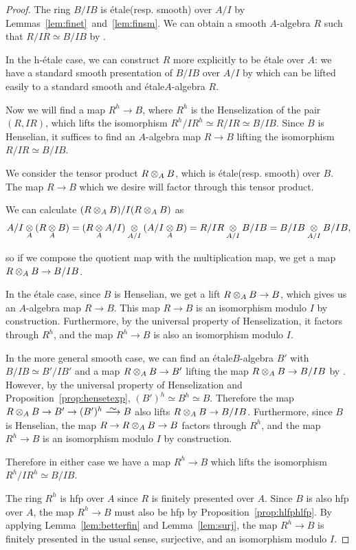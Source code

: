 \documentclass[12pt]{article}
\newcommand\simto{\stackrel{\textstyle\sim}{\smash{\longrightarrow}\rule{0pt}{0.4ex}}}
\newcommand{\Et}{\'etale\xspace}
\newcommand{\hfp}{hfp\xspace}
\newcommand{\hetale}{h-\'etale\xspace}
\newcommand{\spcite}[2]{\cite[\href{https://stacks.math.columbia.edu/tag/#1}{{#2} {#1}}]{stackp}}
\theoremstyle{definition}
\numberwithin{equation}{subsection}
\begin{document}
\begin{proof} The ring $B/IB$ is \Et (resp. smooth) over $A/I$ by Lemmas~\ref{lem:finet}~and~\ref{lem:finsm}. We can obtain a smooth $A$-algebra $R$ such that $R/IR \simeq B/IB$ by \cite[Theorem 1.3.1]{arabia}. 

In the \hetale case, we can construct $R$ more explicitly to be \Et over $A$: we have a standard smooth presentation of $B/IB$ over $A/I$ by \spcite{00U9}{Lemma} which can be lifted easily to a standard smooth and \Et $A$-algebra $R$. 

Now we will find a map $R^h \to B$, where $R^h$ is the Henselization of the pair $(R,IR)$, which lifts the isomorphism $R^h/IR^h \simeq R/IR \simeq B/IB$. Since $B$ is Henselian, it suffices to find an $A$-algebra map $R \to B$ lifting the isomorphism $R/IR \simeq B/IB$.

We consider the tensor product $R \tens_A B$, which is \Et (resp. smooth) over $B$. The map $R \to B$ which we desire will factor through this tensor product.

We can calculate $(R \tens_A B)/I(R \tens_A B)$ as $$A/I \tens_A (R \tens_A B)  = (R \tens_A  A/I) \tens_{A/I} (A/I \tens_A B) = R/IR \tens_{A/I} B/IB = B/IB \tens_{A/I} B/IB,$$

so if we compose the quotient map with the multiplication map, we get a map $R \tens_A B \to B/IB$.

In the \Et case, since $B$ is Henselian, we get a lift $R \tens_A B \to B$, which gives us an $A$-algebra map $R \to B$. This map $R \to B$ is an isomorphism modulo $I$ by construction. Furthermore, by the universal property of Henselization, it factors through $R^h$, and the map $R^h \to B$ is also an isomorphism modulo $I$.

In the more general smooth case, we can find an \Et $B$-algebra $B'$ with $B/IB \simeq B'/IB'$ and a map $R \tens_A B \to B'$ lifting the map $R \tens_A B \to B/IB$ by \spcite{07M7}{Lemma}. However, by the universal property of Henselization and Proposition~\ref{prop:hensetexp}, $(B')^h \simeq B^h \simeq B$. Therefore the map $R \tens_A B \to B' \to (B')^h \simto B$ also lifts $R \tens_A B \to B/IB$. Furthermore, since $B$ is Henselian, the map $R \to R \tens_A B \to B$ factors through $R^h$, and the map $R^h \to B$ is an isomorphism modulo $I$ by construction.

Therefore in either case we have a map $R^h \to B$ which lifts the isomorphism $R^h/IR^h \simeq B/IB$.

The ring $R^h$ is \hfp over $A$ since $R$ is finitely presented over $A$. Since $B$ is also \hfp over $A$, the map $R^h \to B$ must also be \hfp by Proposition~\ref{prop:hlfphlfp}. By applying Lemma~\ref{lem:betterfin} and Lemma~\ref{lem:surj}, the map $R^h \to B$ is finitely presented in the usual sense, surjective, and an isomorphism modulo $I$.


\end{proof}
\end{document}
